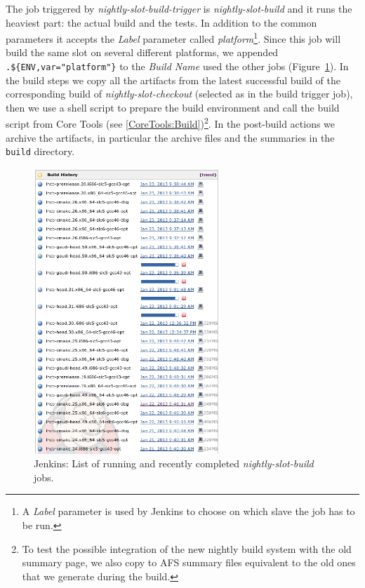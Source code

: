 \documentclass{lhcbnote}
\begin{document}
The job triggered by \emph{nightly-slot-build-trigger} is
\emph{nightly-slot-build} and it runs the heaviest part: the actual build and
the tests.  In addition to the common parameters it accepts the \emph{Label}
parameter called \emph{platform}\footnote{A \emph{Label} parameter is used by
Jenkins to choose on which slave the job has to be run.}.  Since this job will
build the same slot on several different platforms, we appended
\verb|.${ENV,var="platform"}| to the \emph{Build Name} used the other jobs
(Figure~\ref{fig:jenkins-builds}).  In the build steps we copy all the artifacts
from the latest successful build of the corresponding build of
\emph{nightly-slot-checkout} (selected as in the build trigger job), then we use
a shell script to prepare the build environment and call the build script from
Core Tools (see \ref{CoreTools:Build})\footnote{To test the possible integration
of the new nightly build system with the old summary page, we also copy to AFS
summary files equivalent to the old ones that we generate during the build.}.
In the post-build actions we archive the artifacts, in particular the archive
files and the summaries in the \texttt{build} directory.

\begin{figure}
  \begin{center}
    \includegraphics[width=7cm]{images/jenkins-3}
  \end{center}
  \caption{Jenkins: List of running and recently completed
  \emph{nightly-slot-build} jobs.}
  \label{fig:jenkins-builds}
\end{figure}
\end{document}
